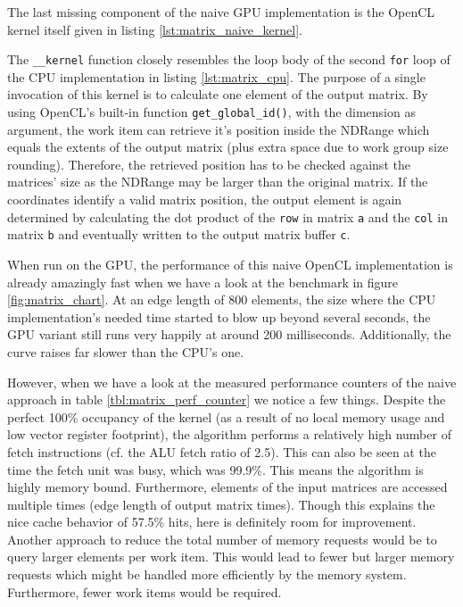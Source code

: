 The last missing component of the naive GPU implementation is the OpenCL kernel itself given in listing \ref{lst:matrix_naive_kernel}.



The \lstinline!__kernel! function closely resembles the loop body of the second \lstinline!for! loop of the CPU implementation in listing \ref{lst:matrix_cpu}. The purpose of a single invocation of this kernel is to calculate one element of the output matrix. By using OpenCL's built-in function \lstinline!get_global_id()!, with the dimension as argument, the work item can retrieve it's position inside the NDRange which equals the extents of the output matrix (plus extra space due to work group size rounding). Therefore, the retrieved position has to be checked against the matrices' size as the NDRange may be larger than the original matrix. If the coordinates identify a valid matrix position, the output element is again determined by calculating the dot product of the \lstinline!row! in matrix \lstinline!a! and the \lstinline!col! in matrix \lstinline!b! and eventually written to the output matrix buffer \lstinline!c!.

When run on the GPU, the performance of this naive OpenCL implementation is already amazingly fast when we have a look at the benchmark in figure \ref{fig:matrix_chart}. At an edge length of 800 elements, the size where the CPU implementation's needed time started to blow up beyond several seconds, the GPU variant still runs very happily at around 200 milliseconds. Additionally, the curve raises far slower than the CPU's one.

However, when we have a look at the measured performance counters of the naive approach in table \ref{tbl:matrix_perf_counter} we notice a few things. Despite the perfect 100\% occupancy of the kernel (as a result of no local memory usage and low vector register footprint), the algorithm performs a relatively high number of fetch instructions (cf. the ALU fetch ratio of 2.5). This can also be seen at the time the fetch unit was busy, which was 99.9\%. This means the algorithm is highly memory bound. Furthermore, elements of the input matrices are accessed multiple times (edge length of output matrix times). Though this explains the nice cache behavior of 57.5\% hits, here is definitely room for improvement.
Another approach to reduce the total number of memory requests would be to query larger elements per work item. This would lead to fewer but larger memory requests which might be handled more efficiently by the memory system. Furthermore, fewer work items would be required.

